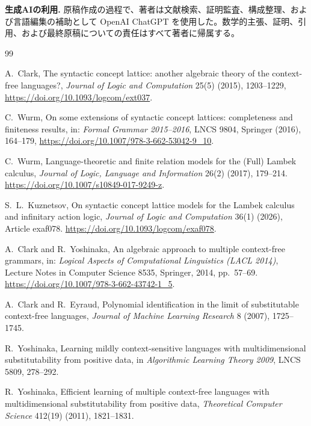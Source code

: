 \documentclass[10pt,a4paper]{ltjsarticle}
\theoremstyle{definition}
\theoremstyle{remark}
\begin{document}
\noindent\textbf{生成AIの利用.}
原稿作成の過程で、著者は文献検索、証明監査、構成整理、および言語編集の補助として OpenAI ChatGPT を使用した。数学的主張、証明、引用、および最終原稿についての責任はすべて著者に帰属する。

\small
\begin{thebibliography}{99}

A.~Clark,
\newblock The syntactic concept lattice: another algebraic theory of the context-free languages?,
\newblock \emph{Journal of Logic and Computation} 25(5) (2015), 1203--1229,
\newblock \url{https://doi.org/10.1093/logcom/ext037}.

C.~Wurm,
\newblock On some extensions of syntactic concept lattices: completeness and finiteness results,
\newblock in: \emph{Formal Grammar 2015--2016}, LNCS 9804, Springer (2016), 164--179,
\newblock \url{https://doi.org/10.1007/978-3-662-53042-9_10}.

C.~Wurm,
\newblock Language-theoretic and finite relation models for the (Full) Lambek calculus,
\newblock \emph{Journal of Logic, Language and Information} 26(2) (2017), 179--214.
\newblock \url{https://doi.org/10.1007/s10849-017-9249-z}.

S.~L.~Kuznetsov,
\newblock On syntactic concept lattice models for the Lambek calculus and infinitary action logic,
\newblock \emph{Journal of Logic and Computation} 36(1) (2026), Article exaf078.
\newblock \url{https://doi.org/10.1093/logcom/exaf078}.

A.~Clark and R.~Yoshinaka,
\newblock An algebraic approach to multiple context-free grammars,
\newblock in: \emph{Logical Aspects of Computational Linguistics (LACL 2014)},
Lecture Notes in Computer Science 8535, Springer, 2014, pp.~57--69.
\newblock \url{https://doi.org/10.1007/978-3-662-43742-1_5}.

A.~Clark and R.~Eyraud,
\newblock Polynomial identification in the limit of substitutable
context-free languages,
\newblock \emph{Journal of Machine Learning Research} 8 (2007), 1725--1745.

R.~Yoshinaka,
\newblock Learning mildly context-sensitive languages with multidimensional
substitutability from positive data,
\newblock in \emph{Algorithmic Learning Theory 2009}, LNCS 5809,
278--292.

R.~Yoshinaka,
\newblock Efficient learning of multiple context-free languages with
multidimensional substitutability from positive data,
\newblock \emph{Theoretical Computer Science} 412(19) (2011), 1821--1831.


\end{thebibliography}
\end{document}
